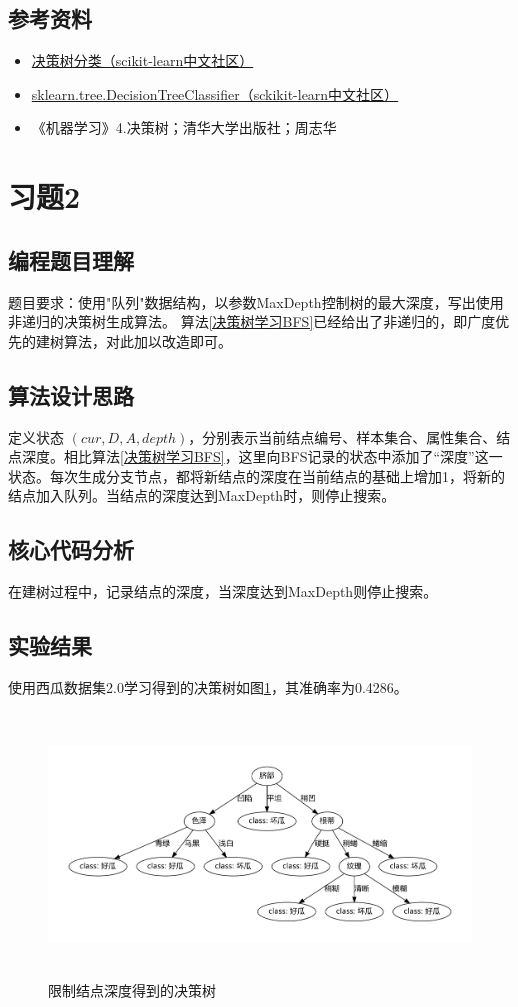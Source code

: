 \documentclass{ctexart}
\begin{document}
	\subsection{参考资料}   
	\begin{itemize}
		\item \href{https://scikit-learn.org.cn/view/89.html#1.10.1%20%E5%88%86%E7%B1%BB}{决策树分类（scikit-learn中文社区）}
		\item \href{https://scikit-learn.org.cn/view/784.html}{sklearn.tree.DecisionTreeClassifier（sckikit-learn中文社区）}
		\item 《机器学习》4.决策树；清华大学出版社；周志华
	\end{itemize}
	\section{习题2}
	
	\subsection{编程题目理解}
	题目要求：使用"队列"数据结构，以参数MaxDepth控制树的最大深度，写出使用非递归的决策树生成算法。
	算法\ref{决策树学习BFS}已经给出了非递归的，即广度优先的建树算法，对此加以改造即可。
	\subsection{算法设计思路}
	定义状态 $(cur,D,A,depth)$，分别表示当前结点编号、样本集合、属性集合、结点深度。相比算法\ref{决策树学习BFS}，这里向BFS记录的状态中添加了“深度”这一状态。每次生成分支节点，都将新结点的深度在当前结点的基础上增加1，将新的结点加入队列。当结点的深度达到MaxDepth时，则停止搜索。
	\subsection{核心代码分析}
	在建树过程中，记录结点的深度，当深度达到MaxDepth则停止搜索。
	
	\subsection{实验结果}
	使用西瓜数据集2.0学习得到的决策树如图\ref{MaxDepth决策树}，其准确率为0.4286。
	\begin{figure}[!htb]
		\centering
		\includegraphics[scale=1,height=7cm]{../image/limit_MaxDepth-Gain-watermelon2.0.gv.pdf}
		\caption{限制结点深度得到的决策树}
		\label{MaxDepth决策树}
	\end{figure}
\end{document}
